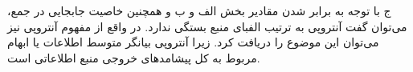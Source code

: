 \SubProblem
{ج}
{
    با توجه به برابر شدن مقادیر بخش الف و ب و همچنین خاصیت جابجایی در جمع، می‌توان گفت آنتروپی به ترتیب الفبای منبع بستگی ندارد. در واقع از مفهوم آنتروپی نیز می‌توان این موضوع را دریافت کرد. زیرا آنتروپی بیانگر متوسط اطلاعات یا ابهام مربوط به کل پیشامدهای خروجی منبع اطلاعاتی است.
}